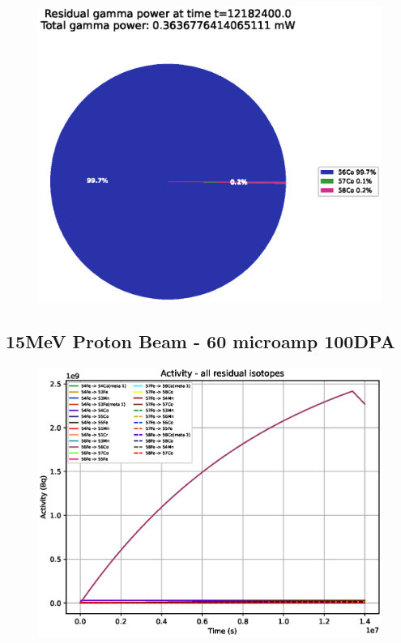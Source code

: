 \begin{figure}[!htb]
\centering
\includegraphics[width=0.7\linewidth]{chapters/results_activity_code/fe_100dpa/endofbeam/10MeV_0500_12182400.eps}
\caption{}
\label{fig:5mev-proton-100dpa}
\end{figure}



\clearpage
\FloatBarrier
\subsection{15MeV Proton Beam - 60 microamp 100DPA}

\begin{figure}[!htb]
\centering
\includegraphics[width=0.7\linewidth]{chapters/results_activity_code/fe_100dpa/by_isotope/15MeV_all_radioactive_isotopes.eps}
\caption{}
\label{fig:5mev-proton-100dpa-activity}
\end{figure}

